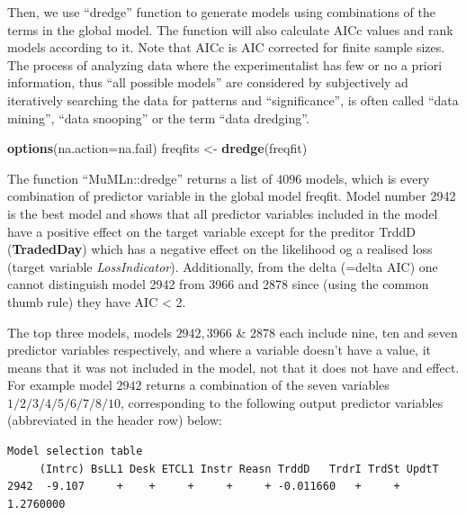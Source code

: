 \documentclass[]{DissertateUSU}
\newenvironment{Shaded}{\begin{snugshade}}{\end{snugshade}}
\newcommand{\KeywordTok}[1]{\textcolor[rgb]{0.13,0.29,0.53}{\textbf{#1}}}
\newcommand{\DataTypeTok}[1]{\textcolor[rgb]{0.13,0.29,0.53}{#1}}
\newcommand{\StringTok}[1]{\textcolor[rgb]{0.31,0.60,0.02}{#1}}
\newcommand{\NormalTok}[1]{#1}
\begin{document}
\doublespacing

Then, we use ``dredge'' function to generate models using combinations
of the terms in the global model. The function will also calculate AICc
values and rank models according to it. Note that AICc is AIC corrected
for finite sample sizes. The process of analyzing data where the
experimentalist has few or no a priori information, thus ``all possible
models'' are considered by subjectively ad iteratively searching the
data for patterns and ``significance'', is often called ``data mining'',
``data snooping'' or the term ``data dredging''.

\singlespacing

\begin{Shaded}
\begin{Highlighting}[]
\KeywordTok{options}\NormalTok{(}\DataTypeTok{na.action=}\NormalTok{na.fail)}
\NormalTok{freqfits <-}\StringTok{ }\KeywordTok{dredge}\NormalTok{(freqfit)}
\end{Highlighting}
\end{Shaded}

\doublespacing

The function ``MuMLn::dredge'' returns a list of \(4096\) models, which
is every combination of predictor variable in the global model freqfit.
Model number 2942 is the best model and shows that all predictor
variables included in the model have a positive effect on the target
variable except for the preditor TrddD (\textbf{TradedDay}) which has a
negative effect on the likelihood og a realised loss (target variable
\emph{LossIndicator}). Additionally, from the delta (=delta AIC) one
cannot distinguish model 2942 from 3966 and 2878 since (using the common
thumb rule) they have AIC \textless{} 2.\medskip

The top three models, models \(2942, 3966\) \& \(2878\) each include
nine, ten and seven predictor variables respectively, and where a
variable doesn't have a value, it means that it was not included in the
model, not that it does not have and effect. For example model \(2942\)
returns a combination of the seven variables \(1/2/3/4/5/6/7/8/10\),
corresponding to the following output predictor variables (abbreviated
in the header row) below:

\singlespacing

\begin{verbatim}
Model selection table 
     (Intrc) BsLL1 Desk ETCL1 Instr Reasn TrddD   TrdrI TrdSt UpdtT 
2942  -9.107     +    +     +     +     + -0.011660   +     + 1.2760000 
\end{verbatim}
\end{document}
